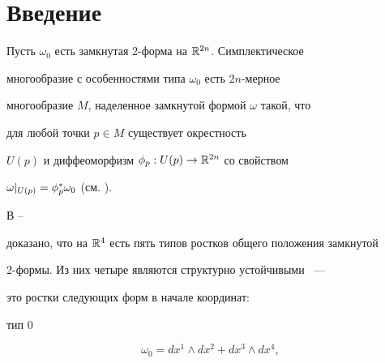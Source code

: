 \date{}




\pagestyle{plain} %







\maketitle


\label{begin}








\section{Введение}





Пусть $\omega_0$ есть замкнутая 2-форма на ${\Bbb R}^{2n}$. Симплектическое


многообразие с особенностями типа $\omega_0$ есть $2n$-мерное


многообразие $M$, наделенное замкнутой формой $\omega$ такой, что


для любой точки $p \in M$ существует окрестность


$U(p)$ и диффеоморфизм $\phi_p : U(p) \to {\Bbb R}^{2n}$ со свойством


$\omega |_{U(p)} = \phi^*_p\omega_0$ (см. \cite{MA}).





В \cite{Mart1}--\cite{GolTish}


доказано, что на ${\Bbb R}^4$ есть пять типов ростков общего положения замкнутой


2-формы. Из них четыре являются структурно устойчивыми ~---


это ростки следующих форм в начале координат:


\smallskip





тип 0


$$


\omega_0 = dx^1\wedge dx^2 + dx^3\wedge dx^4,


$$





